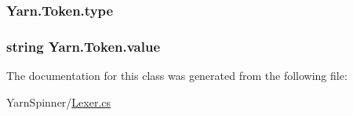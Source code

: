 \hypertarget{a00093_a471a25da67fda0524f2375f9a882aafa}{
\subsubsection[{type}]{ Yarn.\-Token.\-type}}\label{a00093_a471a25da67fda0524f2375f9a882aafa}
\hypertarget{a00093_a3df6b32d6190a639619a3f064c2154e2}{
\subsubsection[{value}]{\setlength{\rightskip}{0pt plus 5cm}string Yarn.\-Token.\-value}}\label{a00093_a3df6b32d6190a639619a3f064c2154e2}


The documentation for this class was generated from the following file\-:\begin{DoxyCompactItemize}
\item 
Yarn\-Spinner/\hyperlink{a00140}{Lexer.\-cs}\end{DoxyCompactItemize}
